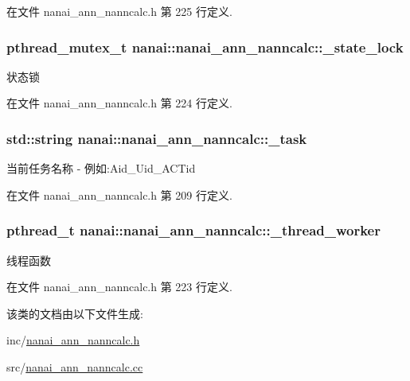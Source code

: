 在文件 nanai\+\_\+ann\+\_\+nanncalc.\+h 第 225 行定义.

\hypertarget{classnanai_1_1nanai__ann__nanncalc_a25ab2c0cf73a5ff7201ad1cd339626dc}{}
\subsubsection[{\+\_\+state\+\_\+lock}]{\setlength{\rightskip}{0pt plus 5cm}pthread\+\_\+mutex\+\_\+t nanai\+::nanai\+\_\+ann\+\_\+nanncalc\+::\+\_\+state\+\_\+lock\hspace{0.3cm}{\ttfamily [protected]}}\label{classnanai_1_1nanai__ann__nanncalc_a25ab2c0cf73a5ff7201ad1cd339626dc}
状态锁 

在文件 nanai\+\_\+ann\+\_\+nanncalc.\+h 第 224 行定义.

\hypertarget{classnanai_1_1nanai__ann__nanncalc_ab659b8655ab02f5922ecb19c6418f02c}{}
\subsubsection[{\+\_\+task}]{\setlength{\rightskip}{0pt plus 5cm}std\+::string nanai\+::nanai\+\_\+ann\+\_\+nanncalc\+::\+\_\+task\hspace{0.3cm}{\ttfamily [protected]}}\label{classnanai_1_1nanai__ann__nanncalc_ab659b8655ab02f5922ecb19c6418f02c}
当前任务名称 -\/ 例如\+:Aid\+\_\+\+Uid\+\_\+\+A\+C\+Tid 

在文件 nanai\+\_\+ann\+\_\+nanncalc.\+h 第 209 行定义.

\hypertarget{classnanai_1_1nanai__ann__nanncalc_ad8115ff56ea159a5e1d43c9752ed5936}{}
\subsubsection[{\+\_\+thread\+\_\+worker}]{\setlength{\rightskip}{0pt plus 5cm}pthread\+\_\+t nanai\+::nanai\+\_\+ann\+\_\+nanncalc\+::\+\_\+thread\+\_\+worker\hspace{0.3cm}{\ttfamily [protected]}}\label{classnanai_1_1nanai__ann__nanncalc_ad8115ff56ea159a5e1d43c9752ed5936}
线程函数 

在文件 nanai\+\_\+ann\+\_\+nanncalc.\+h 第 223 行定义.



该类的文档由以下文件生成\+:\begin{DoxyCompactItemize}
\item 
inc/\hyperlink{nanai__ann__nanncalc_8h}{nanai\+\_\+ann\+\_\+nanncalc.\+h}\item 
src/\hyperlink{nanai__ann__nanncalc_8cc}{nanai\+\_\+ann\+\_\+nanncalc.\+cc}\end{DoxyCompactItemize}
